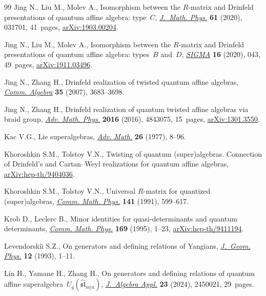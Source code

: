 \begin{thebibliography}{99}
Jing N., Liu M., Molev A., Isomorphism between the {$R$}-matrix and {D}rinfeld
 presentations of quantum affine algebra: type~{$C$}, \href{https://doi.org/10.1063/1.5133854}{\textit{J.~Math. Phys.}}
 \textbf{61} (2020), 031701, 41~pages, \href{https://arxiv.org/abs/1903.00204}{arXiv:1903.00204}.

Jing N., Liu M., Molev A., Isomorphism between the $R$-matrix and {D}rinfeld
 presentations of quantum affine algebra: types~$B$ and~$D$, \href{https://doi.org/10.3842/SIGMA.2020.043}{\textit{SIGMA}}
 \textbf{16} (2020), 043, 49~pages, \href{https://arxiv.org/abs/1911.03496}{arXiv:1911.03496}.

Jing N., Zhang H., Drinfeld realization of twisted quantum affine algebras,
 \href{https://doi.org/10.1080/00927870701404713}{\textit{Comm. Algebra}} \textbf{35} (2007), 3683--3698.

Jing N., Zhang H., Drinfeld realization of quantum twisted affine algebras via
 braid group, \href{https://doi.org/10.1155/2016/4843075}{\textit{Adv. Math. Phys.}} \textbf{2016} (2016), 4843075,
 15~pages, \href{https://arxiv.org/abs/1301.3550}{arXiv:1301.3550}.

Kac V.G., Lie superalgebras, \href{https://doi.org/10.1016/0001-8708(77)90017-2}{\textit{Adv. Math.}} \textbf{26} (1977), 8--96.

Khoroshkin S.M., Tolstoy V.N., Twisting of quantum (super)algebras.
 {C}onnection of {D}rinfeld's and {C}artan--{W}eyl realizations for quantum
 affine algebras, \href{https://arxiv.org/abs/hep-th/9404036}{arXiv:hep-th/9404036}.

Khoroshkin S.M., Tolstoy V.N., Universal {$R$}-matrix for quantized
 (super)algebras, \href{https://doi.org/10.1007/BF02102819}{\textit{Comm. Math. Phys.}} \textbf{141} (1991), 599--617.

Krob D., Leclerc B., Minor identities for quasi-determinants and quantum
 determinants, \href{https://doi.org/10.1007/BF02101594}{\textit{Comm. Math. Phys.}} \textbf{169} (1995), 1--23,
 \href{https://arxiv.org/abs/hep-th/9411194}{arXiv:hep-th/9411194}.

Levendorski\u{\i} S.Z., On generators and defining relations of {Y}angians,
 \href{https://doi.org/10.1016/0393-0440(93)90084-R}{\textit{J.~Geom. Phys.}} \textbf{12} (1993), 1--11.

Lin H., Yamane H., Zhang H., On generators and defining relations of quantum
 affine superalgebra~{$U_q (\widehat{\mathfrak{sl}}_{m|n})$},
 \href{https://doi.org/10.1142/S021949882450021X}{\textit{J.~Algebra Appl.}} \textbf{23} (2024), 2450021, 29~pages.


\end{thebibliography}
